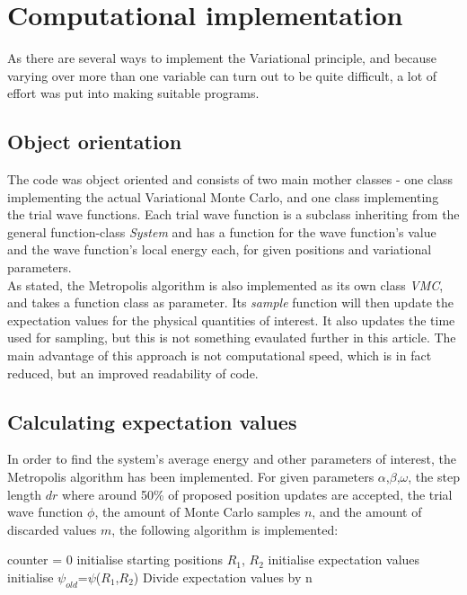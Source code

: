 \documentclass[10pt,a4paper]{article}
\begin{document}
\section{Computational implementation}
As there are several ways to implement the Variational principle, and because varying over more than one variable can turn out to be quite difficult, a lot of effort was put into making suitable programs.
\subsection{Object orientation}
The code was object oriented and consists of two main mother classes - one class implementing the actual Variational Monte Carlo, and one class implementing the trial wave functions. Each trial wave function  is a subclass inheriting from the general function-class \textit{System} and has a function for the wave function's value and the wave function's local energy each, for given positions and variational parameters.\\
As stated, the Metropolis algorithm is also implemented as its own class  \textit{VMC}, and takes a function class as parameter. Its \textit{sample} function will then update the expectation values for the physical quantities of interest. It also updates the time used for sampling, but this is not something evaulated further in this article. 
The main advantage of this approach is not computational speed, which is in fact reduced, but an improved readability of code.
\subsection{Calculating expectation values}
In order to find the system's average energy and other parameters of interest, the Metropolis algorithm has been implemented. 
For given parameters $\alpha$,$\beta$,$\omega$, the step length $dr$ where around 50\% of proposed position updates are accepted, the trial wave function $\phi$, the amount of Monte Carlo samples $n$, and the amount of discarded values $m$, the following algorithm is implemented:\\
\IncMargin{1em}
\begin{algorithm}[H]
counter = 0\;
initialise starting positions $R_1$, $R_2$\;
initialise expectation values\;
initialise $\psi_{old}$=$\psi$($R_1$,$R_2$)\;
Divide expectation values by n\; 
\end{algorithm}
\DecMargin{1em}
\end{document}
